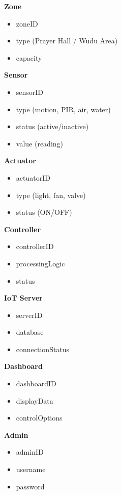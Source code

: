 \textbf{Zone}
\begin{itemize}
  \item zoneID
  \item type (Prayer Hall / Wudu Area)
  \item capacity
\end{itemize}

\textbf{Sensor}
\begin{itemize}
  \item sensorID
  \item type (motion, PIR, air, water)
  \item status (active/inactive)
  \item value (reading)
\end{itemize}

\textbf{Actuator}
\begin{itemize}
  \item actuatorID
  \item type (light, fan, valve)
  \item status (ON/OFF)
\end{itemize}

\textbf{Controller}
\begin{itemize}
  \item controllerID
  \item processingLogic
  \item status
\end{itemize}

\textbf{IoT Server}
\begin{itemize}
  \item serverID
  \item database
  \item connectionStatus
\end{itemize}

\textbf{Dashboard}
\begin{itemize}
  \item dashboardID
  \item displayData
  \item controlOptions
\end{itemize}

\textbf{Admin}
\begin{itemize}
  \item adminID
  \item username
  \item password
\end{itemize}

